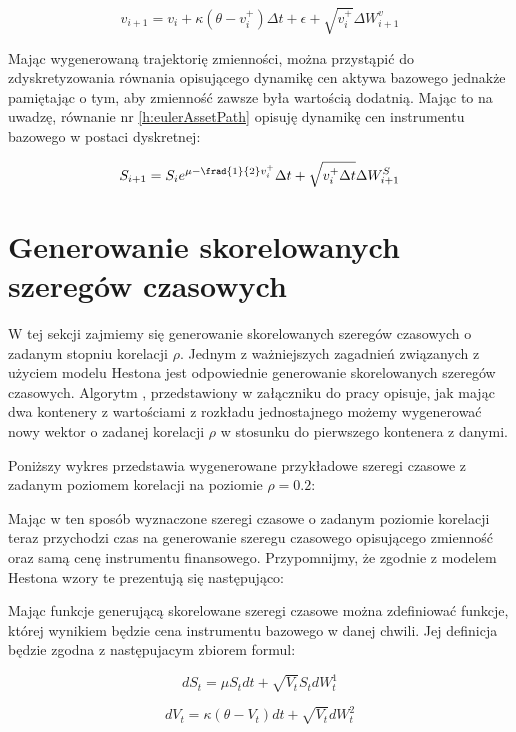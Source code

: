 \documentclass{pracamgr}
\begin{document}
\begin{equation}\label{h:eulerNonZero}
v_{i+1}  = v_i + \kappa (\theta - v_i^+) \Delta t + \epsilon +  \sqrt{v_i^+} \Delta W^{v}_{i+1}
\end{equation}

Mając wygenerowaną trajektorię zmienności, można przystąpić do zdyskretyzowania równania opisującego 
dynamikę cen aktywa bazowego jednakże pamiętając o tym, aby zmienność zawsze była wartością dodatnią. 
Mając to na uwadzę, równanie nr \ref{h:eulerAssetPath} opisuję dynamikę cen instrumentu bazowego w postaci dyskretnej:

\begin{equation}\label{h:eulerAssetPath}
S_{i+1} = S_i e^{\mu - \frad{1}{2} v_i^+} \Delta t + \sqrt{v_i^+ \Delta t}  \Delta W_{i+1}^S
\end{equation}
  
\section{Generowanie skorelowanych szeregów czasowych}
W tej sekcji zajmiemy się generowanie skorelowanych szeregów czasowych o zadanym stopniu korelacji $\rho$.
Jednym z ważniejszych zagadnień związanych z użyciem modelu Hestona jest odpowiednie generowanie skorelowanych szeregów czasowych. Algorytm , przedstawiony w załączniku do pracy opisuje, jak mając dwa kontenery z wartościami z rozkładu jednostajnego możemy wygenerować nowy wektor o zadanej korelacji $\rho$ w stosunku do pierwszego kontenera z danymi. 

Poniższy wykres przedstawia wygenerowane przykładowe szeregi czasowe z zadanym poziomem korelacji na poziomie $\rho = 0.2$:


Mając w ten sposób wyznaczone szeregi czasowe o zadanym poziomie korelacji teraz przychodzi czas na generowanie szeregu czasowego opisującego zmienność oraz samą cenę instrumentu finansowego. 
Przypomnijmy, że zgodnie z modelem Hestona wzory te prezentują się następująco:

Mając funkcje generującą skorelowane szeregi czasowe można zdefiniować funkcje, której wynikiem będzie cena instrumentu bazowego w danej chwili. Jej definicja będzie zgodna z następujacym zbiorem formul: \cite{OptimalInvestment2010}

\begin{equation}
dS_t =  \mu S_t  dt + \sqrt{V_t}S_t dW_t^1
\end{equation}

\begin{equation}
dV_t =  \kappa (\theta - V_t)  dt + \sqrt{V_t} dW_t^2
\end{equation}
\end{document}
